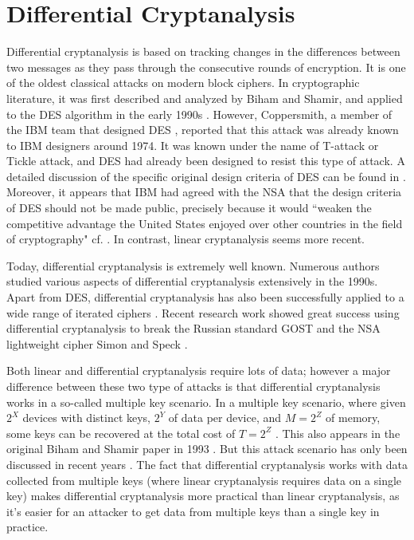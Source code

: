 \section{Differential Cryptanalysis} \label{sec:differentialCry}
Differential cryptanalysis is based on tracking changes in the differences between two messages as they pass through the consecutive rounds of encryption. It is one of the oldest classical attacks on modern block ciphers. In cryptographic literature, it was first described and analyzed by Biham and Shamir, and applied to the DES algorithm in the early 1990s \cite{biham1993differential}. However, Coppersmith, a member of the IBM team that designed DES \cite{coppersmith1994data,coppersmith2000development,courtois2003s},  reported that this attack was already known to IBM designers around 1974. It was known under the name of T-attack or Tickle attack, and DES had already been designed to resist this type of attack. A detailed discussion of the specific original design criteria of DES can be found in \cite{courtois2003s}. Moreover, it appears that IBM had agreed with the NSA that the design criteria of DES should not be made public, precisely because it would ``weaken the competitive advantage the United States enjoyed over other countries in the field of cryptography" cf. \cite{coppersmith1994data,coppersmith2000development}. In contrast, linear cryptanalysis seems more recent. 

Today, differential cryptanalysis is extremely well known. Numerous authors studied various aspects of differential cryptanalysis extensively in the 1990s. Apart from DES, differential cryptanalysis has also been successfully applied to a wide range of iterated ciphers \cite{knudsen1993cryptanalysis,massey1994safer}.  Recent research work showed great success using differential cryptanalysis to break the Russian standard GOST  \cite{gostdc0,gostdc1} and the NSA lightweight cipher Simon and Speck \cite{simon3,simon2}.

Both linear and differential cryptanalysis require lots of data; however a major difference between these two type of attacks is that differential cryptanalysis works in a so-called multiple key scenario. In a multiple key scenario, where given $2^{X}$ devices with distinct keys, $2^{Y}$ of data per device, and $M = 2^{Z}$ of memory, some keys can be recovered at the total cost of $T = 2^{Z}$ \cite{courtois2013cryptanalysis}. This also appears in the original Biham and Shamir paper in 1993 \cite{biham1993differential}. But this attack scenario has only been discussed in recent years \cite{courtois2013cryptanalysis}. The fact that differential cryptanalysis works with data collected from multiple keys (where linear cryptanalysis requires data on a single key) makes differential cryptanalysis more practical than linear cryptanalysis, as it's easier for an attacker to get data from multiple keys than a single key in practice.


